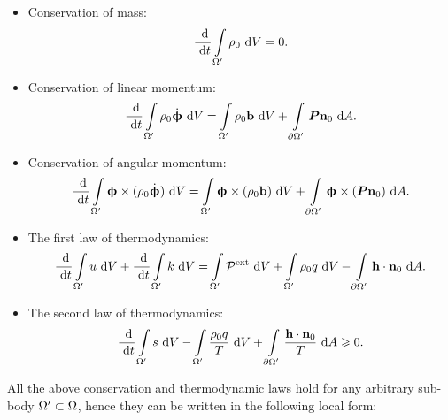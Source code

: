 \begin{itemize}
  \item Conservation of mass:
        \begin{align}
          \dfrac{\text{ d}}{\text{ d}t} \int\limits_{\Omega'} \rho_0 \text{ d}V = 0.
        \end{align}
  \item Conservation of linear momentum:
        \begin{align}
          \dfrac{\text{ d}}{\text{ d}t} \int\limits_{\Omega'} \rho_0 \dot{\boldsymbol{\upphi}} \text{ d}V = \int\limits_{\Omega'} \rho_0 \textbf{b} \text{ d}V + \int\limits_{{\partial \Omega}'} \boldsymbol{P}\textbf{n}_0 \text{ d}A.
        \end{align}
  \item Conservation of angular momentum:
        \begin{align}
          \dfrac{\text{ d}}{\text{ d}t} \int\limits_{\Omega'} \boldsymbol{\upphi} \times (\rho_0 \dot{\boldsymbol{\upphi}}) \text{ d}V = \int\limits_{\Omega'} \boldsymbol{\upphi} \times (\rho_0 \textbf{b}) \text{ d}V + \int\limits_{{\partial \Omega}'} \boldsymbol{\upphi} \times (\boldsymbol{P}\textbf{n}_0) \text{ d}A.
        \end{align}
  \item The first law of thermodynamics:
        \begin{equation}
          \begin{aligned}
            \dfrac{\text{ d}}{\text{ d}t} \int\limits_{\Omega'} u \text{ d}V + \dfrac{\text{ d}}{\text{ d}t} \int\limits_{\Omega'} k \text{ d}V = \int\limits_{\Omega'} \mathcal{P}^\text{ext} \text{ d}V + \int\limits_{\Omega'} \rho_0 q \text{ d}V - \int\limits_{{\partial \Omega}'} \textbf{h} \cdot \textbf{n}_0 \text{ d}A.
          \end{aligned}
        \end{equation}
  \item The second law of thermodynamics:
        \begin{align}
          \dfrac{\text{ d}}{\text{ d}t} \int\limits_{\Omega'} s \text{ d}V - \int\limits_{\Omega'} \dfrac{\rho_0 q}{T} \text{ d}V + \int\limits_{{\partial \Omega}'} \dfrac{\textbf{h} \cdot \textbf{n}_0}{T} \text{ d}A \geqslant 0.
        \end{align}
\end{itemize}
All the above conservation and thermodynamic laws hold for any arbitrary sub-body $\Omega' \subset \Omega$, hence they can be written in the following local form:
